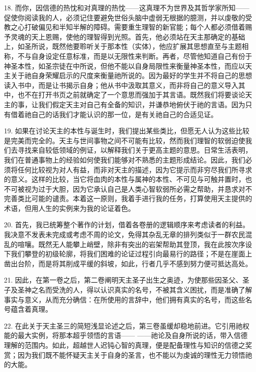 18. 而你，因信德的热忱和对真理的热忱——这真理不为世界及其哲学家所知——促使你阅读我的人，必须记住要避免世俗头脑中虚弱无根据的臆测，并以虔敬的受教之心打破偏见和半知半解的障碍。需要重生理智的新官能；每个人都必须借着赐予灵魂的天上恩赐，使他的理智得到光照。首先，他必须站在天主那确定的基础上，如圣所说，既然他要聆听关于那本性（实体），他应扩展其思想直至与主题相称，不与自身设定任意标准，而是以无限性来判断。再者，尽管他知道自己有份于神圣本性，如圣宗徒在中所说，但他不能以自身局限性来衡量神圣本性，而应以天主关于祂自身荣耀启示的尺度来衡量祂所说的。因为最好的学生并不将自己的思想读入书中，而是让书揭示自身；他从书中汲取其意义，而非将自己的意义导入其中，也不在打开书页之前就确定了一个意思而强加于其言语。既然我们将要谈论天主的事，让我们假定天主对自己有全备的知识，并谦恭地俯伏于祂的言语。因为只有借着祂自己的话我们才能认识的那一位，是有关祂自己的合适见证。\par

19. 如果在讨论天主的本性与诞生时，我们提出某些类比，但愿无人认为这些比较是完美而完全的。天主与世间事物之间不可能有比较，然而我们理智的软弱迫使我们去寻找来自较低领域的例证，以解释我们关于更高主题的意思。日常生活表明，我们在普通事物上的经验如何使我们能够对不熟悉的主题形成结论。因此，我们必须将任何比较视为对人有益，而非对天主的描述，因为它提示而非穷尽我们所寻求的意义。这样的比较，当它将血肉的本性与属神的本性、不可见与可触并置时，也不可被视为过于大胆，因为它承认自己是人类心智软弱所必需之帮助，并恳求对不完善类比可能的谴责。本着这一原则，我着手进行我的任务，打算使用天主提供的术语，但用人生的实例来为我的论证着色。\par

20. 首先，我已统筹整个著作的计划，借着各卷册的逻辑顺序来考虑读者的利益。我决意不发表未完成或考虑不周的论文，免得其杂乱无章的排列类似于一群农民混乱的喧嚷。既然无人能攀上峭壁，除非有突出的岩架帮助其登顶，我在此按次序设下我们攀登的初级轮廓，将我们困难的论证过程引向最易行的路径；不是在崖面上凿出台阶，而是将其削成平缓的斜坡，如此，行者几乎不感到努力便可抵达高处。\par

21. 因此，在第一卷之后，第二卷阐明天主圣子出生之奥迹，为使那些因圣父、圣子及圣神之名而受洗的人，得以认识真实的名号，不被其含义困扰，而是准确了解事实与意义，从而充分确信：在所使用的言辞中，他们拥有真实的名号，而这些名号蕴含着真理。\par

22. 在此关于天主圣三的简短浅显论述之后，第三卷虽缓却稳地前进。它引用祂权能的最大实例，将那本超乎领悟的言语—— ——祂论及自身所说的话，带入信德理解的范围内。如此，超越世人迟钝心智的真理，便是配备理性与知识的信德之奖赏；因为我们既不能怀疑天主关于自身的圣言，也不能以为虔诚的理性无力领悟祂的大能。\par

